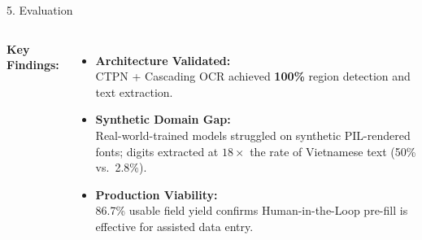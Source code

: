 \documentclass[10pt,aspectratio=169]{beamer}
\begin{document}
\begin{frame}{5. Evaluation}
\begin{columns}[t]
    \textbf{Key Findings:}
    \begin{itemize}
      \item \textbf{Architecture Validated:}\\ CTPN + Cascading OCR achieved \textbf{100\%} region detection and text extraction.
      \vspace{0.2cm}
      \item \textbf{Synthetic Domain Gap:}\\ Real-world-trained models struggled on synthetic PIL-rendered fonts; digits extracted at $18\times$ the rate of Vietnamese text (50\% vs.\ 2.8\%).
      \vspace{0.2cm}
      \item \textbf{Production Viability:}\\ 86.7\% usable field yield confirms Human-in-the-Loop pre-fill is effective for assisted data entry.
    \end{itemize}
  \end{columns}
\end{frame}
\end{document}
